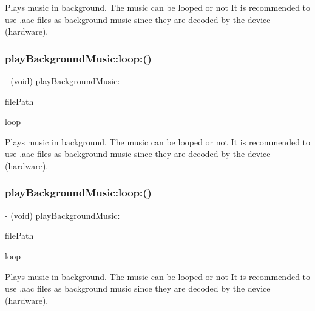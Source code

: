 Plays music in background. The music can be looped or not It is recommended to use .aac files as background music since they are decoded by the device (hardware). \mbox{\label{interfaceCDAudioManager_a940bfd555f763ee56217b6d589cb6a30}} 
\subsubsection{\texorpdfstring{play\+Background\+Music\+:loop\+:()}{playBackgroundMusic:loop:()}\hspace{0.1cm}{\footnotesize\ttfamily [2/4]}}
{\footnotesize\ttfamily -\/ (void) play\+Background\+Music\+: \begin{DoxyParamCaption}\item[{(N\+S\+String $\ast$)}]{file\+Path }\item[{loop:(B\+O\+OL)}]{loop }\end{DoxyParamCaption}}

Plays music in background. The music can be looped or not It is recommended to use .aac files as background music since they are decoded by the device (hardware). \mbox{\label{interfaceCDAudioManager_a940bfd555f763ee56217b6d589cb6a30}} 
\subsubsection{\texorpdfstring{play\+Background\+Music\+:loop\+:()}{playBackgroundMusic:loop:()}\hspace{0.1cm}{\footnotesize\ttfamily [3/4]}}
{\footnotesize\ttfamily -\/ (void) play\+Background\+Music\+: \begin{DoxyParamCaption}\item[{(N\+S\+String $\ast$)}]{file\+Path }\item[{loop:(B\+O\+OL)}]{loop }\end{DoxyParamCaption}}

Plays music in background. The music can be looped or not It is recommended to use .aac files as background music since they are decoded by the device (hardware). \mbox{\label{interfaceCDAudioManager_a940bfd555f763ee56217b6d589cb6a30}} 
